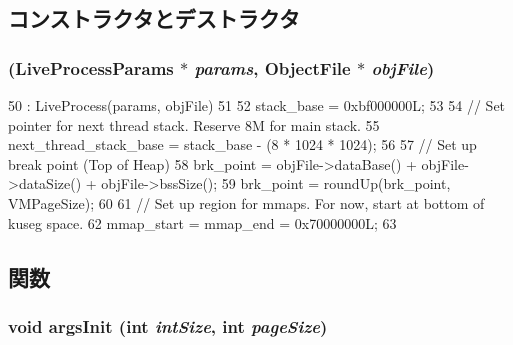 \subsection{コンストラクタとデストラクタ}
\hypertarget{classPowerLiveProcess_af5aa42a7d1a5ffdd21ec2c4d8b8a5890}{
\subsubsection[{PowerLiveProcess}]{ (LiveProcessParams $\ast$ {\em params}, \/  {\bf ObjectFile} $\ast$ {\em objFile})}}
\label{classPowerLiveProcess_af5aa42a7d1a5ffdd21ec2c4d8b8a5890}



\begin{DoxyCode}
50     : LiveProcess(params, objFile)
51 {
52     stack_base = 0xbf000000L;
53 
54     // Set pointer for next thread stack.  Reserve 8M for main stack.
55     next_thread_stack_base = stack_base - (8 * 1024 * 1024);
56 
57     // Set up break point (Top of Heap)
58     brk_point = objFile->dataBase() + objFile->dataSize() + objFile->bssSize();
59     brk_point = roundUp(brk_point, VMPageSize);
60 
61     // Set up region for mmaps. For now, start at bottom of kuseg space.
62     mmap_start = mmap_end = 0x70000000L;
63 }
\end{DoxyCode}


\subsection{関数}
\hypertarget{classPowerLiveProcess_a60e5314ffeede1e51c6bcb2cf606ca92}{
\subsubsection[{argsInit}]{\setlength{\rightskip}{0pt plus 5cm}void argsInit (int {\em intSize}, \/  int {\em pageSize})}}
\label{classPowerLiveProcess_a60e5314ffeede1e51c6bcb2cf606ca92}



